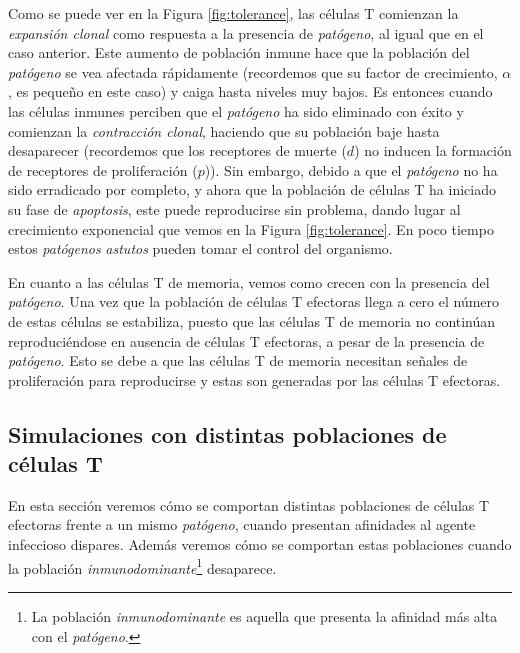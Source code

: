 Como se puede ver en la Figura \ref{fig:tolerance}, las células T comienzan la \textit{expansión clonal} como respuesta a la presencia de \textit{patógeno}, al igual que en el caso anterior. Este aumento de población inmune hace que la población del \textit{patógeno} se vea afectada rápidamente (recordemos que su factor de crecimiento, $\alpha$, es pequeño en este caso) y caiga hasta niveles muy bajos. Es entonces cuando las células inmunes perciben que el \textit{patógeno} ha sido eliminado con éxito y comienzan la \textit{contracción clonal}, haciendo que su población baje hasta desaparecer (recordemos que los receptores de muerte ($d$) no inducen la formación de receptores de proliferación ($p$)). Sin embargo, debido a que el \textit{patógeno} no ha sido erradicado por completo, y ahora que la población de células T ha iniciado su fase de \textit{apoptosis}, este puede reproducirse sin problema, dando lugar al crecimiento exponencial que vemos en la Figura \ref{fig:tolerance}. En poco tiempo estos \textit{patógenos} \textit{astutos} pueden tomar el control del organismo. 

En cuanto a las células T de memoria, vemos como crecen con la presencia del \textit{patógeno}. Una vez que la población de células T efectoras llega a cero el número de estas células se estabiliza, puesto que las células T de memoria no continúan reproduciéndose en ausencia de células T efectoras, a pesar de la presencia de \textit{patógeno}. Esto se debe a que las células T de memoria necesitan señales de proliferación para reproducirse y estas son generadas por las células T efectoras. 


\subsection{Simulaciones con distintas poblaciones de células T}
\label{sim:difPoblacionesT}

En esta sección veremos cómo se comportan distintas poblaciones de células T efectoras frente a un mismo \textit{patógeno}, cuando presentan afinidades al agente infeccioso dispares. Además veremos cómo se comportan estas poblaciones cuando la población \textit{inmunodominante}\footnote{La población \textit{inmunodominante} es aquella que presenta la afinidad más alta con el \textit{patógeno}.} desaparece.

